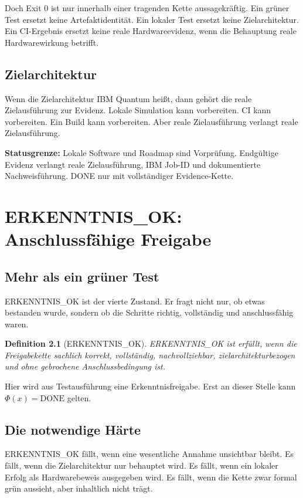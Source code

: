 \documentclass[11pt,a4paper,oneside]{book}
\newtheorem{definition}{Definition}[chapter]
\newcommand{\PhiDone}{\ensuremath{\Phi(x)=\mathrm{DONE}}}
\begin{document}
Doch Exit 0 ist nur innerhalb einer tragenden Kette aussagekräftig. Ein grüner Test ersetzt keine Artefaktidentität. Ein lokaler Test ersetzt keine Zielarchitektur. Ein CI-Ergebnis ersetzt keine reale Hardwareevidenz, wenn die Behauptung reale Hardwarewirkung betrifft.

\section{Zielarchitektur}

Wenn die Zielarchitektur IBM Quantum heißt, dann gehört die reale Zielausführung zur Evidenz. Lokale Simulation kann vorbereiten. CI kann vorbereiten. Ein Build kann vorbereiten. Aber reale Zielausführung verlangt reale Zielausführung.

\begin{warnbox}
\textbf{Statusgrenze:} Lokale Software und Roadmap sind Vorprüfung. Endgültige Evidenz verlangt reale Zielausführung, IBM Job-ID und dokumentierte Nachweisführung. DONE nur mit vollständiger Evidence-Kette.
\end{warnbox}

\chapter{ERKENNTNIS\_OK: Anschlussfähige Freigabe}

\section{Mehr als ein grüner Test}

ERKENNTNIS\_OK ist der vierte Zustand. Er fragt nicht nur, ob etwas bestanden wurde, sondern ob die Schritte richtig, vollständig und anschlussfähig waren.

\begin{definition}[ERKENNTNIS\_OK]
ERKENNTNIS\_OK ist erfüllt, wenn die Freigabekette sachlich korrekt, vollständig, nachvollziehbar, zielarchitekturbezogen und ohne gebrochene Anschlussbedingung ist.
\end{definition}

Hier wird aus Testausführung eine Erkenntnisfreigabe. Erst an dieser Stelle kann \PhiDone{} gelten.

\section{Die notwendige Härte}

ERKENNTNIS\_OK fällt, wenn eine wesentliche Annahme unsichtbar bleibt. Es fällt, wenn die Zielarchitektur nur behauptet wird. Es fällt, wenn ein lokaler Erfolg als Hardwarebeweis ausgegeben wird. Es fällt, wenn die Kette zwar formal grün aussieht, aber inhaltlich nicht trägt.
\end{document}
